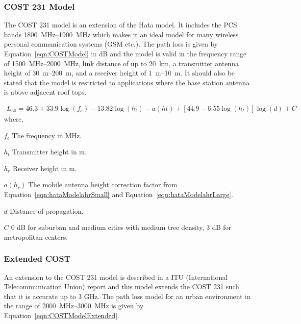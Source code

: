 \subsubsection{COST 231 Model}
The COST 231 model is an extension of the Hata model. It includes the PCS bands \SIrange{1800}{1900}{MHz} which makes it an ideal model for many wireless personal communication systems (GSM etc.). The path loss is given by Equation~\ref{eqn:COSTModel} in dB\cite{Seybold2005introduction} and the model is valid in the frequency range of  \SIrange{1500}{2000}{MHz}, link distance of up to \SI{20}{km}, a transmitter antenna height of \SIrange{30}{200}{m}, and a receiver height of \SIrange{1}{10}{m}\cite{Seybold2005introduction}. It should also be stated that the model is restricted to applications where the base station antenna is above adjacent roof tops. 

\begin{align} 
\label{eqn:COSTModel}
L_{50} = 46.3+33.9 \log(f_c)-13.82 \log(h_t)-a(ht)+[44.9-6.55 \log(h_t)] \log(d) + C 
\end{align} 
where, 
\begin{where}
\item [$f_c$] The frequency in \si{MHz}.
\item [$h_t$] Transmitter height in \si{m}. 
\item [$h_r$] Receiver height in \si{m}.
\item [$a(h_r)$] The mobile antenna height correction factor from Equation~\ref{eqn:hataModelahrSmall} and Equation~\ref{eqn:hataModelahrLarge}.
\item [$d$] Distance of propagation.
\item [$C$] 0 dB for suburban and medium cities with medium tree density, 3 dB for metropolitan centers. 
\end{where}

\subsubsection{Extended COST}
An extension to the COST 231 model is described in a ITU (International Telecommunication Union) report \cite{itu2002report} and this model extends the COST 231 such that it is accurate up to 3 GHz. The path loss model for an urban environment in the range of \SIrange{2000}{3000}{MHz} is given by Equation~\ref{eqn:COSTModelExtended}\cite{itu2002report}.   

